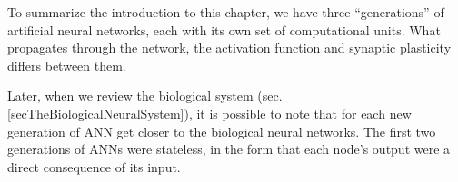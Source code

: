 
















To summarize the introduction to this chapter, we have three ``generations'' of artificial neural networks, each with its own set of computational units.
What propagates through the network, the activation function and synaptic plasticity differs between them. 

Later, when we review the biological system (sec. \ref{secTheBiologicalNeuralSystem}), it is possible to note that for each new generation of ANN get closer to the biological neural networks.
The first two generations of ANNs were stateless, in the form that each node's output were a direct consequence of its input. 

